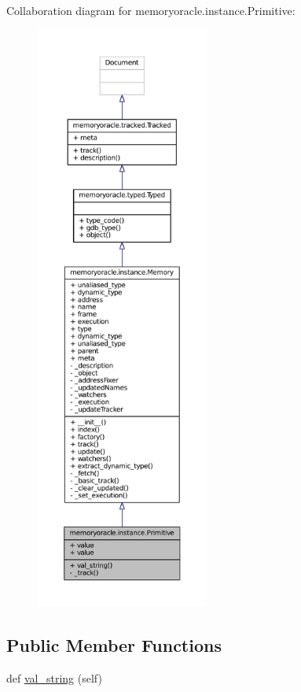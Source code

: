 Collaboration diagram for memoryoracle.\+instance.\+Primitive\+:
\nopagebreak
\begin{figure}[H]
\begin{center}
\leavevmode
\includegraphics[height=550pt]{classmemoryoracle_1_1instance_1_1Primitive__coll__graph}
\end{center}
\end{figure}
\subsection*{Public Member Functions}
\begin{DoxyCompactItemize}
\item 
def \hyperlink{classmemoryoracle_1_1instance_1_1Primitive_abc513cbf3d0938c0db133e9af0a6f5ea}{val\+\_\+string} (self)
\end{DoxyCompactItemize}
